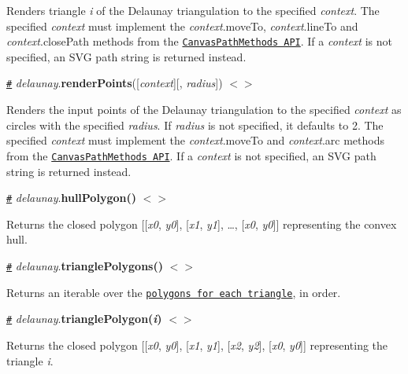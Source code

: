 Renders triangle {\itshape i} of the Delaunay triangulation to the specified {\itshape context}. The specified {\itshape context} must implement the {\itshape context}.move\+To, {\itshape context}.line\+To and {\itshape context}.close\+Path methods from the \href{https://www.w3.org/TR/2dcontext/#canvaspathmethods}{\tt Canvas\+Path\+Methods A\+PI}. If a {\itshape context} is not specified, an S\+VG path string is returned instead.

\href{#delaunay_renderPoints}{\tt \#} {\itshape delaunay}.{\bfseries render\+Points}(\mbox{[}{\itshape context}\mbox{]}\mbox{[}, {\itshape radius}\mbox{]}) \href{https://github.com/d3/d3-delaunay/blob/master/src/delaunay.js}{\tt $<$$>$}

Renders the input points of the Delaunay triangulation to the specified {\itshape context} as circles with the specified {\itshape radius}. If {\itshape radius} is not specified, it defaults to 2. The specified {\itshape context} must implement the {\itshape context}.move\+To and {\itshape context}.arc methods from the \href{https://www.w3.org/TR/2dcontext/#canvaspathmethods}{\tt Canvas\+Path\+Methods A\+PI}. If a {\itshape context} is not specified, an S\+VG path string is returned instead.

\href{#delaunay_hullPolygon}{\tt \#} {\itshape delaunay}.{\bfseries hull\+Polygon()} \href{https://github.com/d3/d3-delaunay/blob/master/src/delaunay.js}{\tt $<$$>$}

Returns the closed polygon \mbox{[}\mbox{[}{\itshape x0}, {\itshape y0}\mbox{]}, \mbox{[}{\itshape x1}, {\itshape y1}\mbox{]}, …, \mbox{[}{\itshape x0}, {\itshape y0}\mbox{]}\mbox{]} representing the convex hull.

\href{#delaunay_trianglePolygons}{\tt \#} {\itshape delaunay}.{\bfseries triangle\+Polygons()} \href{https://github.com/d3/d3-delaunay/blob/master/src/delaunay.js}{\tt $<$$>$}

Returns an iterable over the \href{#delaunay_trianglePolygon}{\tt polygons for each triangle}, in order.

\href{#delaunay_trianglePolygon}{\tt \#} {\itshape delaunay}.{\bfseries triangle\+Polygon({\itshape i})} \href{https://github.com/d3/d3-delaunay/blob/master/src/delaunay.js}{\tt $<$$>$}

Returns the closed polygon \mbox{[}\mbox{[}{\itshape x0}, {\itshape y0}\mbox{]}, \mbox{[}{\itshape x1}, {\itshape y1}\mbox{]}, \mbox{[}{\itshape x2}, {\itshape y2}\mbox{]}, \mbox{[}{\itshape x0}, {\itshape y0}\mbox{]}\mbox{]} representing the triangle {\itshape i}.

